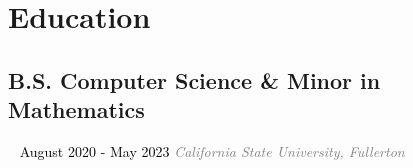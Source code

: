 \documentclass{article}
\newcommand{\resumesection}[3]{
    \subsection*{#1}
    \ 
    \normalsize
    \normalsize
    \hfill
    \textcolor{black}{#3}
    \normalsize
    \newline
    \small
    \textcolor{grey}{\emph{#2}}
}
\begin{document}
\pagestyle{useheader}
\section*{Education}
\resumesection{B.S. Computer Science \& Minor in Mathematics}{California State University, Fullerton}{August 2020 - May 2023}
\end{document}

